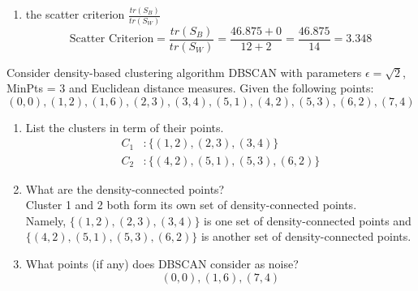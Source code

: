 \documentclass[12pt]{article}
\newcommand{\ques}[1]{\noindent {\bf Question #1: }}
\begin{document}
\begin{enumerate}
\item the scatter criterion $\frac{tr(S_B)}{tr(S_W)}$ 
$$ \text{Scatter Criterion} = \frac{tr(S_B)}{tr(S_W)} = \frac{46.875 + 0}{12 + 2} = \frac{46.875}{14} = 3.348 $$ 

\end{enumerate} 

\ques{4} Consider density-based clustering algorithm DBSCAN with parameters $\epsilon = \sqrt{2}$, MinPts = $3$ and Euclidean distance measures. Given the following points: 
$$ (0,0), (1,2), (1,6), (2,3), (3,4), (5,1), (4,2), (5,3), (6,2), (7,4) $$ 
\begin{enumerate} 
\item List the clusters in term of their points. 
$$ \begin{aligned} C_1 &: \{(1,2), (2,3), (3,4)\} \\ C_2 &: \{(4,2), (5,1), (5,3), (6,2)\} \end{aligned} $$ 

\item What are the density-connected points? \\ 
Cluster 1 and 2 both form its own set of density-connected points. \\ Namely, $\{(1,2), (2,3), (3,4)\}$ is one set of density-connected points and \\ $\{(4,2), (5,1), (5,3), (6,2)\}$ is another set of density-connected points. 

\item What points (if any) does DBSCAN consider as noise?
$$ (0,0), (1,6), (7,4) $$ 

\end{enumerate}
\end{document}
